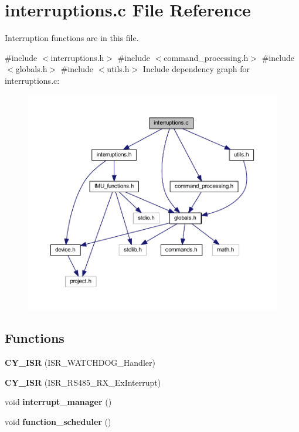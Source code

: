 \section{interruptions.\+c File Reference}
\label{interruptions_8c}


Interruption functions are in this file.  


{\ttfamily \#include $<$interruptions.\+h$>$}\newline
{\ttfamily \#include $<$command\+\_\+processing.\+h$>$}\newline
{\ttfamily \#include $<$globals.\+h$>$}\newline
{\ttfamily \#include $<$utils.\+h$>$}\newline
Include dependency graph for interruptions.\+c\+:
\nopagebreak
\begin{figure}[H]
\begin{center}
\leavevmode
\includegraphics[width=350pt]{interruptions_8c__incl}
\end{center}
\end{figure}
\subsection*{Functions}
\begin{DoxyCompactItemize}
\item 
\mbox{\label{interruptions_8c_aba74df0c62c62434ebccf8124c5d5fef}} 
{\bfseries C\+Y\+\_\+\+I\+SR} (I\+S\+R\+\_\+\+W\+A\+T\+C\+H\+D\+O\+G\+\_\+\+Handler)
\item 
\mbox{\label{interruptions_8c_a7692d8c3185943c5bdfaa6de0a172ad3}} 
{\bfseries C\+Y\+\_\+\+I\+SR} (I\+S\+R\+\_\+\+R\+S485\+\_\+\+R\+X\+\_\+\+Ex\+Interrupt)
\item 
\mbox{\label{interruptions_8c_a9790811526002d99b25a814afd02cbae}} 
void {\bfseries interrupt\+\_\+manager} ()
\item 
\mbox{\label{interruptions_8c_a0fe51278c957933282ca63f3ac9beeaf}} 
void {\bfseries function\+\_\+scheduler} ()
\end{DoxyCompactItemize}



